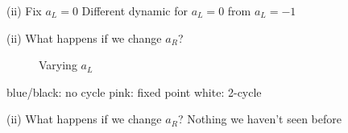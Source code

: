 \documentclass{beamer}
\newcounter{n}
\newcounter{f}
\begin{document}
\begin{frame}{(ii) Fix $a_L = 0$}
    Different dynamic for $a_L = 0$ from $a_L= -1$
\end{frame}

\begin{frame}{(ii) What happens if we change $a_R$?}
    \begin{figure}
        \centering
         \qquad
        \caption{Varying $a_L$}
    \end{figure}

    blue/black: no cycle
    \hspace*{\fill}
    pink: fixed point
    \hspace*{\fill}
    white: 2-cycle
\end{frame}

\begin{frame}{(ii) What happens if we change $a_R$?}
    Nothing we haven't seen before
\end{frame}
\end{document}
